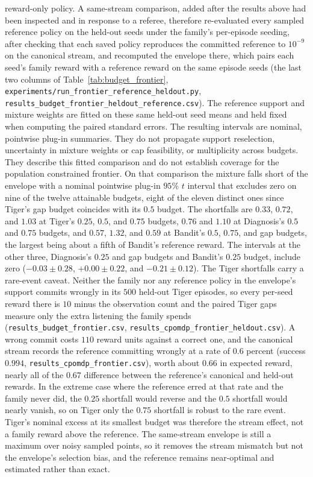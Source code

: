 reward-only policy. A same-stream comparison, added after the results above had been inspected and in response to a referee, therefore re-evaluated every sampled reference policy on the held-out seeds under the family's per-episode seeding, after checking that each saved policy reproduces the committed reference to $10^{-9}$ on the canonical stream, and recomputed the envelope there, which pairs each seed's family reward with a reference reward on the same episode seeds (the last two columns of Table~\ref{tab:budget_frontier}, \texttt{experiments/\allowbreak run\_\allowbreak frontier\_\allowbreak reference\_\allowbreak heldout.py}, \texttt{results\_\allowbreak budget\_\allowbreak frontier\_\allowbreak heldout\_\allowbreak reference.csv}). The reference support and mixture weights are fitted on these same held-out seed means and held fixed when computing the paired standard errors. The resulting intervals are nominal, pointwise plug-in summaries. They do not propagate support reselection, uncertainty in mixture weights or cap feasibility, or multiplicity across budgets. They describe this fitted comparison and do not establish coverage for the population constrained frontier. On that comparison the mixture falls short of the envelope with a nominal pointwise plug-in $95\%$ $t$ interval that excludes zero on nine of the twelve attainable budgets, eight of the eleven distinct ones since Tiger's gap budget coincides with its $0.5$ budget. The shortfalls are $0.33$, $0.72$, and $1.03$ at Tiger's $0.25$, $0.5$, and $0.75$ budgets, $0.76$ and $1.10$ at Diagnosis's $0.5$ and $0.75$ budgets, and $0.57$, $1.32$, and $0.59$ at Bandit's $0.5$, $0.75$, and gap budgets, the largest being about a fifth of Bandit's reference reward. The intervals at the other three, Diagnosis's $0.25$ and gap budgets and Bandit's $0.25$ budget, include zero ($-0.03 \pm 0.28$, $+0.00 \pm 0.22$, and $-0.21 \pm 0.12$). The Tiger shortfalls carry a rare-event caveat. Neither the family nor any reference policy in the envelope's support commits wrongly in its $500$ held-out Tiger episodes, so every per-seed reward there is $10$ minus the observation count and the paired Tiger gaps measure only the extra listening the family spends (\texttt{results\_\allowbreak budget\_\allowbreak frontier.csv}, \texttt{results\_\allowbreak cpomdp\_\allowbreak frontier\_\allowbreak heldout.csv}). A wrong commit costs $110$ reward units against a correct one, and the canonical stream records the reference committing wrongly at a rate of $0.6$ percent (success $0.994$, \texttt{results\_\allowbreak cpomdp\_\allowbreak frontier.csv}), worth about $0.66$ in expected reward, nearly all of the $0.67$ difference between the reference's canonical and held-out rewards. In the extreme case where the reference erred at that rate and the family never did, the $0.25$ shortfall would reverse and the $0.5$ shortfall would nearly vanish, so on Tiger only the $0.75$ shortfall is robust to the rare event. Tiger's nominal excess at its smallest budget was therefore the stream effect, not a family reward above the reference. The same-stream envelope is still a maximum over noisy sampled points, so it removes the stream mismatch but not the envelope's selection bias, and the reference remains near-optimal and estimated rather than exact.

